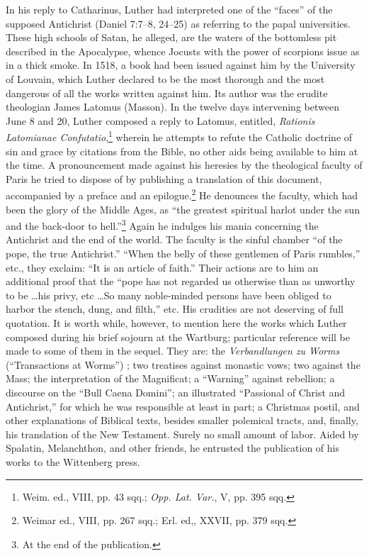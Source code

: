 In his reply to Catharinus, Luther had interpreted one of the
“faces” of the supposed Antichrist (Daniel 7:7–8, 24–25)
as referring to
the papal universities. These high schools of Satan, he alleged, are
the waters of the bottomless pit described in the Apocalypse, whence
Jocusts with the power of scorpions issue as in a thick smoke. In
1518, a book had been issued against him by the University of
Louvain, which Luther declared to be the most thorough and the most
dangerous of all the works written against him. Its author was the
erudite theologian James Latomus (Masson). In the twelve days
intervening between June 8 and 20, Luther composed a reply to
Latomus, entitled, \textit{Rationis Latomianae Confutatio},\footnote{Weim. ed., VIII, pp. 43 sqq.; \textit{Opp. Lat. Var.}, V, pp. 395 sqq.}
wherein he attempts to refute the Catholic doctrine of sin and grace by
citations from the Bible, no other aids being available to him at the time.
A pronouncement made against his heresies by the theological faculty
of Paris he tried to dispose of by publishing a translation of this
document, accompanied by a preface and an epilogue.\footnote{Weimar ed., VIII, pp. 267 sqq.; Erl. ed,, XXVII, pp. 379 sqq.}
He denounces
the faculty, which had been the glory of the Middle Ages, as “the
greatest spiritual harlot under the sun and the back-door to hell.”\footnote{At the end of the publication.}
Again he indulges his mania concerning the Antichrist and the end
of the world. The faculty is the sinful chamber “of the pope, the
true Antichrist.” “When the belly of these gentlemen of Paris
rumbles,” etc., they exclaim: “It is an article of faith.” Their actions
are to him an additional proof that the “pope has not regarded us
otherwise than as unworthy to be \dots his privy, etc \dots So many
noble-minded persons have been obliged to harbor the stench, dung,
and filth,” etc. His crudities are not deserving of full quotation.
It is worth while, however, to mention here the works which
Luther composed during his brief sojourn at the Wartburg; particular
reference will be made to some of them in the sequel. They are: the
\textit{Verbandlungen zu Worms} (“Transactions at Worms”) ; two treatises
against monastic vows; two against the Mass; the interpretation of
the Magnificat; a “Warning” against rebellion; a discourse on the
“Bull Caena Domini”; an illustrated “Passional of Christ and Antichrist,”
for which he was responsible at least in part; a Christmas
postil, and other explanations of Biblical texts, besides smaller polemical
tracts, and, finally, his translation of the New Testament. Surely
no small amount of labor. Aided by Spalatin, Melanchthon, and other
friends, he entrusted the publication of his works to the Wittenberg
press.

